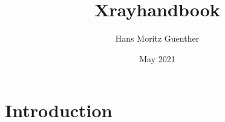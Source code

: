 \documentclass{article}
\title{Xrayhandbook}
\author{Hans Moritz Guenther}
\date{May 2021}
\begin{document}
\maketitle

\section{Introduction}
\end{document}
